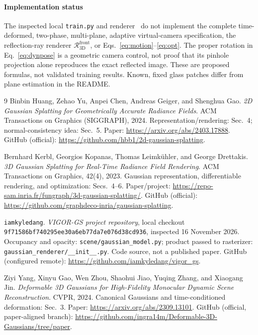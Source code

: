 \documentclass[10pt,a4paper]{article}
\newcommand{\RRf}{\mathcal R_{\mathrm{3D}}^{\mathrm{front}}}
\begin{document}
\paragraph*{Implementation status}
The inspected local \texttt{train.py} and renderer~\cite{vigor} do not implement the complete time-deformed, two-phase, multi-plane, adaptive virtual-camera specification, the reflection-ray renderer $\RRf$, or Eqs.~\eqref{eq:motion}--\eqref{eq:opt}. The proper rotation in Eq.~\eqref{eq:dynpose} is a geometric camera control, not proof that its pinhole projection alone reproduces the exact reflected image. These are proposed formulas, not validated training results. Known, fixed glass patches differ from plane estimation in the README.

\vspace{2mm}
\begin{thebibliography}{9}
\small
\setlength{\itemsep}{5pt}
Binbin Huang, Zehao Yu, Anpei Chen, Andreas Geiger, and Shenghua Gao.
\emph{2D Gaussian Splatting for Geometrically Accurate Radiance Fields}.
ACM Transactions on Graphics (SIGGRAPH), 2024.
Representation/rendering: Sec.~4; normal-consistency idea: Sec.~5.
Paper: \url{https://arxiv.org/abs/2403.17888}.
GitHub (official): \url{https://github.com/hbb1/2d-gaussian-splatting}.

Bernhard Kerbl, Georgios Kopanas, Thomas Leimk\"uhler, and George Drettakis.
\emph{3D Gaussian Splatting for Real-Time Radiance Field Rendering}.
ACM Transactions on Graphics, 42(4), 2023.
Gaussian representation, differentiable rendering, and optimization: Secs.~4--6.
Paper/project: \url{https://repo-sam.inria.fr/fungraph/3d-gaussian-splatting/}.
GitHub (official): \url{https://github.com/graphdeco-inria/gaussian-splatting}.

\texttt{iamkyledang}. \emph{VIGOR-GS project repository}, local checkout
\texttt{9f71586bf740295ee30a6eb77da7e076d38cd936}, inspected 16 November 2026.
Occupancy and opacity: \texttt{scene/gaussian\_model.py}; product passed to rasterizer:
\texttt{gaussian\_renderer/\_\_init\_\_.py}. Code source, not a published paper.
GitHub (configured remote): \url{https://github.com/iamkyledang/vigor_gs}.

Ziyi Yang, Xinyu Gao, Wen Zhou, Shaohui Jiao, Yuqing Zhang, and Xiaogang Jin.
\emph{Deformable 3D Gaussians for High-Fidelity Monocular Dynamic Scene Reconstruction}.
CVPR, 2024. Canonical Gaussians and time-conditioned deformation: Sec.~3.
Paper: \url{https://arxiv.org/abs/2309.13101}.
GitHub (official, paper-aligned branch):
\url{https://github.com/ingra14m/Deformable-3D-Gaussians/tree/paper}.


\end{thebibliography}
\end{document}
